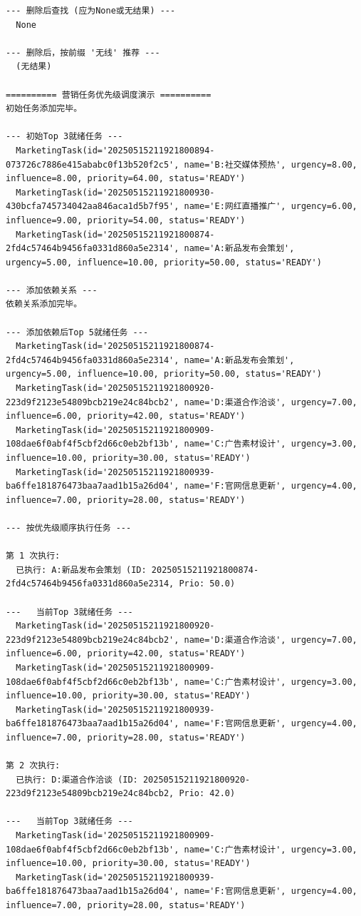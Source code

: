 \documentclass[cn,hazy,blue,10pt,normal]{elegantnote}
\begin{document}
\begin{tiny}
\begin{verbatim}
--- 删除后查找 (应为None或无结果) ---
  None

--- 删除后，按前缀 '无线' 推荐 ---
  (无结果)

========== 营销任务优先级调度演示 ==========
初始任务添加完毕。

--- 初始Top 3就绪任务 ---
  MarketingTask(id='20250515211921800894-073726c7886e415ababc0f13b520f2c5', name='B:社交媒体预热', urgency=8.00, influence=8.00, priority=64.00, status='READY')
  MarketingTask(id='20250515211921800930-430bcfa745734042aa846aca1d5b7f95', name='E:网红直播推广', urgency=6.00, influence=9.00, priority=54.00, status='READY')
  MarketingTask(id='20250515211921800874-2fd4c57464b9456fa0331d860a5e2314', name='A:新品发布会策划', urgency=5.00, influence=10.00, priority=50.00, status='READY')

--- 添加依赖关系 ---
依赖关系添加完毕。

--- 添加依赖后Top 5就绪任务 ---
  MarketingTask(id='20250515211921800874-2fd4c57464b9456fa0331d860a5e2314', name='A:新品发布会策划', urgency=5.00, influence=10.00, priority=50.00, status='READY')
  MarketingTask(id='20250515211921800920-223d9f2123e54809bcb219e24c84bcb2', name='D:渠道合作洽谈', urgency=7.00, influence=6.00, priority=42.00, status='READY')
  MarketingTask(id='20250515211921800909-108dae6f0abf4f5cbf2d66c0eb2bf13b', name='C:广告素材设计', urgency=3.00, influence=10.00, priority=30.00, status='READY')
  MarketingTask(id='20250515211921800939-ba6ffe181876473baa7aad1b15a26d04', name='F:官网信息更新', urgency=4.00, influence=7.00, priority=28.00, status='READY')

--- 按优先级顺序执行任务 ---

第 1 次执行:
  已执行: A:新品发布会策划 (ID: 20250515211921800874-2fd4c57464b9456fa0331d860a5e2314, Prio: 50.0)

---   当前Top 3就绪任务 ---
  MarketingTask(id='20250515211921800920-223d9f2123e54809bcb219e24c84bcb2', name='D:渠道合作洽谈', urgency=7.00, influence=6.00, priority=42.00, status='READY')
  MarketingTask(id='20250515211921800909-108dae6f0abf4f5cbf2d66c0eb2bf13b', name='C:广告素材设计', urgency=3.00, influence=10.00, priority=30.00, status='READY')
  MarketingTask(id='20250515211921800939-ba6ffe181876473baa7aad1b15a26d04', name='F:官网信息更新', urgency=4.00, influence=7.00, priority=28.00, status='READY')

第 2 次执行:
  已执行: D:渠道合作洽谈 (ID: 20250515211921800920-223d9f2123e54809bcb219e24c84bcb2, Prio: 42.0)

---   当前Top 3就绪任务 ---
  MarketingTask(id='20250515211921800909-108dae6f0abf4f5cbf2d66c0eb2bf13b', name='C:广告素材设计', urgency=3.00, influence=10.00, priority=30.00, status='READY')
  MarketingTask(id='20250515211921800939-ba6ffe181876473baa7aad1b15a26d04', name='F:官网信息更新', urgency=4.00, influence=7.00, priority=28.00, status='READY')


\end{verbatim}
\end{tiny}
\end{document}
